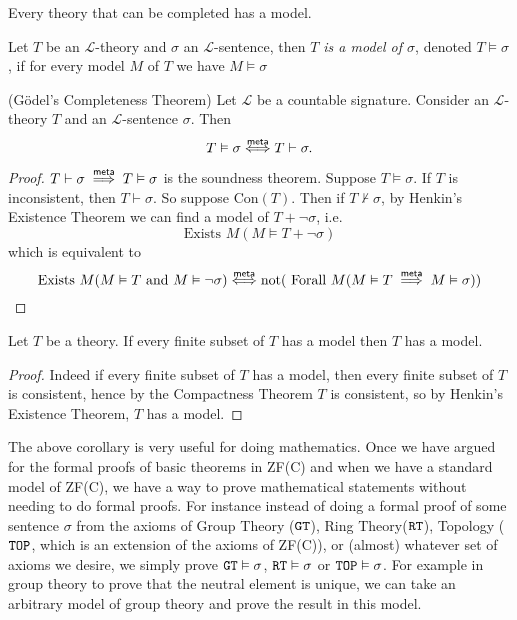 \begin{corollary}
    Every theory that can be completed has a model.
\end{corollary}
\begin{definition}
    Let $T$ be an $\mathcal{L}$-theory and $\sigma$ an $\mathcal{L}$-sentence, then \emph{$T$ is a model of $\sigma$}, denoted $T\vDash \sigma$, if for every model $M$ of $T$ we have $M\vDash \sigma$
\end{definition}
\begin{corollary}(Gödel's Completeness Theorem)
    Let $\mathcal{L}$ be a countable signature. Consider an $\mathcal{L}$-theory $T$ and an $\mathcal{L}$-sentence $\sigma$. Then 
    $$T\vDash \sigma \mathrel{\overset{\mathsf{meta}}{\Longleftrightarrow}} T\vdash \sigma.$$
\end{corollary}
\begin{proof}
    $T\vdash \sigma\mathrel{\overset{\mathsf{meta}}{\implies}} T\vDash \sigma$ is the soundness theorem. Suppose $T\vDash \sigma$. If $T$ is inconsistent, then $T\vdash \sigma$. So suppose $\mathrm{Con}(T)$. Then if $T\not\vdash \sigma$, by Henkin's Existence Theorem we can find a model of $T+\neg \sigma$, i.e. 
    $$\text{Exists } M(M\vDash T+\neg \sigma)$$
    which is equivalent to 
    $$\text{Exists } M( M \vDash T \text{ and } M\vDash \neg\sigma) \mathrel{\overset{\mathsf{meta}}{\Longleftrightarrow}} \text{not}(\text{ Forall } M(M\vDash T \mathrel{\overset{\mathsf{meta}}{\implies}} M \vDash \sigma))$$
\end{proof}
\begin{corollary}
    Let $T$ be a theory. If every finite subset of $T$ has a model then $T$ has a model. 
\end{corollary}
\begin{proof}
    Indeed if every finite subset of $T$ has a model, then every finite subset of $T$ is consistent, hence by the Compactness Theorem $T$ is consistent, so by Henkin's Existence Theorem, $T$ has a model.   
\end{proof}
The above corollary is very useful for doing mathematics. Once we have argued for the formal proofs of basic theorems in ZF(C) and when we have a standard model of ZF(C), we have a way to prove mathematical statements without needing to do formal proofs. For instance instead of doing a formal proof of some sentence $\sigma$ from the axioms of Group Theory ($\verb|GT|$), Ring Theory($\verb|RT|$), Topology ($\verb|TOP|$, which is an extension of the axioms of ZF(C)), or (almost) whatever set of axioms we desire, we simply prove $\verb|GT|\vDash \sigma$, $\verb|RT|\vDash \sigma$ or $\verb|TOP|\vDash \sigma$. For example in group theory to prove that the neutral element is unique, we can take an arbitrary model of group theory and prove the result in this model.  
